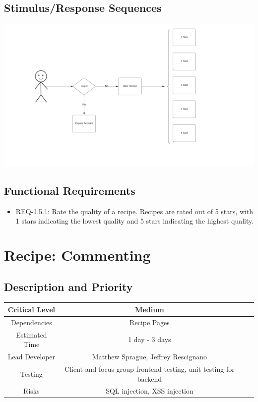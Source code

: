\documentclass{scrreprt}
\begin{document}
\subsection{Stimulus/Response Sequences}

\includegraphics{FlowCharts/Recipe-Rating.png}

\subsection{Functional Requirements}

\begin{itemize}
    \item REQ-1.5.1: Rate the quality of a recipe. Recipes are rated out of 5 stars, with 1 stars indicating the lowest quality and 5 stars indicating the highest quality.
\end{itemize}

\section{Recipe: Commenting}

\subsection{Description and Priority}
\begin{center}
    \begin{tabular}{| c | c | c | c |}
        \hline
        Critical Level & Medium \\
        \hline
        Dependencies & Recipe Pages \\
        \hline
        Estimated Time & 1 day - 3 days \\
        \hline
        Lead Developer & Matthew Sprague, Jeffrey Rescignano \\
        \hline
        Testing & Client and focus group frontend testing, unit testing for backend \\
        \hline
        Risks & SQL injection, XSS injection \\
        \hline
    \end{tabular}
\end{center}
\end{document}
